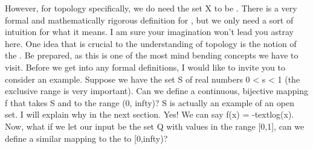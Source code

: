 {}However, for topology specifically, we do need the set \markdownRendererDollarSign{}X\markdownRendererDollarSign{} to be\markdownRendererSoftLineBreak
{}. There is a very formal and mathematically rigorous\markdownRendererSoftLineBreak
{}definition for ,\markdownRendererSoftLineBreak
{}but we only need a sort of intuition for what it means. I am\markdownRendererSoftLineBreak
{}sure your imagination won't lead you astray here.\markdownRendererInterblockSeparator
{}
\markdownRendererSectionEnd \markdownRendererSectionBegin
{}\markdownRendererInterblockSeparator
{}One idea that is crucial to the understanding of topology is the\markdownRendererSoftLineBreak
{}notion of the . Be prepared, as this is one of the most\markdownRendererSoftLineBreak
{}mind bending concepts we have to visit.\markdownRendererParagraphSeparator
{}Before we get into any formal definitions, I would like to invite\markdownRendererSoftLineBreak
{}you to consider an example.\markdownRendererSoftLineBreak
{}Suppose we have the set \markdownRendererDollarSign{}S\markdownRendererDollarSign{} of real numbers \markdownRendererDollarSign{}0 < s < 1\markdownRendererDollarSign{} (the exclusive range is very important). Can we define a continuous, bijective mapping \markdownRendererDollarSign{}f\markdownRendererDollarSign{} that takes \markdownRendererDollarSign{}S\markdownRendererDollarSign{} and to the range \markdownRendererDollarSign{}(0, \markdownRendererBackslash{}infty)\markdownRendererDollarSign{}?\markdownRendererInterblockSeparator
{}\markdownRendererBlockQuoteBegin
\markdownRendererDollarSign{}S\markdownRendererDollarSign{} is actually an example of an open set. I will explain why in the next section.\markdownRendererBlockQuoteEnd \markdownRendererInterblockSeparator
{}Yes! We can say \markdownRendererDollarSign{}f(x) = -\markdownRendererBackslash{}text\markdownRendererLeftBrace{}log\markdownRendererRightBrace{}(x)\markdownRendererDollarSign{}.\markdownRendererParagraphSeparator
{}Now, what if we let our input be the set \markdownRendererDollarSign{}Q\markdownRendererDollarSign{} with values in the   range \markdownRendererDollarSign{}[0,1]\markdownRendererDollarSign{}, can we define a similar mapping to the to \markdownRendererDollarSign{}[0,\markdownRendererBackslash{}infty)\markdownRendererDollarSign{}?\markdownRendererParagraphSeparator
